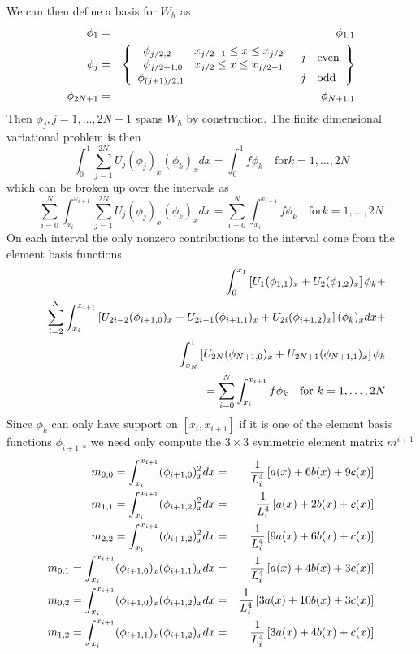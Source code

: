 \documentclass[10pt,dvips,twoside,reqno]{amsart}
\begin{document}
We can then define a basis for $W_h$ as
\begin{eqnarray}
\phi_1 &=& \phi_{1,1} \\
\phi_j &=& \left\{ \begin{array}{ll}
\begin{array}{ll}
\phi_{j/2,2} & x_{j/2-1} \leq x \leq x_{j/2} \\
\phi_{j/2+1,0} & x_{j/2} \leq x \leq x_{j/2+1} \\
\end{array} & j \quad \mbox{even} \\
\phi_{(j+1)/2,1}  & j \quad \mbox{odd}
\end{array}\right\} \\
\phi_{2N+1} &=& \phi_{N+1,1}
\end{eqnarray}
Then $\phi_j, j=1,\ldots,2N+1$ spans $W_h$ by construction. The finite dimensional variational problem is then
\begin{equation}
 \int_0^1  \sum_{j=1}^{2N} U_{j} (\phi_{j})_x (\phi_{k})_x dx = \int_0^1 f \phi_k \quad \mbox{for} k=1,\dots,2N
\end{equation}
which can be broken up over the intervals as
\begin{equation}
 \sum_{i=0}^{N} \int_{x_{i}}^{x_{i+1}}  \sum_{j=1}^{2N} U_{j} (\phi_{j})_x (\phi_{k})_x dx = \sum_{i=0}^{N} \int_{x_{i}}^{x_{i+1}}f \phi_k \quad \mbox{for} k=1,\dots,2N
\end{equation}
On each interval the only nonzero contributions to the interval come from the element basis functions
\begin{eqnarray}
&& \int_0^{x_1} \left[ U_1 (\phi_{1,1})_x + U_2 (\phi_{1,2})_x \right] \phi_k + \\
&& \sum_{i=2}^{N} \int_{x_{i}}^{x_{i+1}}  
\left[ U_{2i-2} (\phi_{i+1,0})_x+ U_{2i-1} (\phi_{i+1,1})_x + U_{2i} (\phi_{i+1,2})_x \right] (\phi_{k})_x dx + \\
&& \int_{x_N}^1 \left[ U_{2N} (\phi_{N+1,0})_x + U_{2N+1} (\phi_{N+1,1})_x \right] \phi_k \\
&&= \sum_{i=0}^{N} \int_{x_{i}}^{x_{i+1}}f \phi_k \quad \mbox{for } k=1,\dots,2N
\end{eqnarray}
Since $\phi_k$ can only have support on $[x_i,x_{i+1}]$ if it is one of the element basis functions $\phi_{i+1,*}$ we need only compute the $3 \times 3$ symmetric element matrix $m^{i+1}$
\begin{eqnarray}
m_{0,0} = \int_{x_i}^{x_{i+1}} (\phi_{i+1,0})_x^2 dx &=& \frac{1}{L^4_i} \left[ a(x) + 6b(x) + 9c(x) \right]\\
m_{1,1} = \int_{x_i}^{x_{i+1}} (\phi_{i+1,2})_x^2 dx &=& \frac{1}{L^4_i}\left[ a(x) + 2b(x) + c(x) \right]\\
m_{2,2} =\int_{x_i}^{x_{i+1}} (\phi_{i+1,2})_x^2 dx &=& \frac{1}{L^4_i}\left[ 9a(x) + 6b(x) + c(x) \right]\\
m_{0,1} = \int_{x_i}^{x_{i+1}} (\phi_{i+1,0})_x (\phi_{i+1,1})_x dx &=& \frac{1}{L^4_i}\left[ a(x) + 4b(x) + 3c(x) \right]\\
m_{0,2} = \int_{x_i}^{x_{i+1}} (\phi_{i+1,0})_x (\phi_{i+1,2})_x dx &=& \frac{1}{L^4_i}\left[ 3a(x) + 10b(x) + 3c(x) \right]\\
m_{1,2} = \int_{x_i}^{x_{i+1}} (\phi_{i+1,1})_x (\phi_{i+1,2})_x dx &=& \frac{1}{L^4_i}\left[ 3a(x) + 4b(x) + c(x) \right]
\end{eqnarray}
\end{document}
